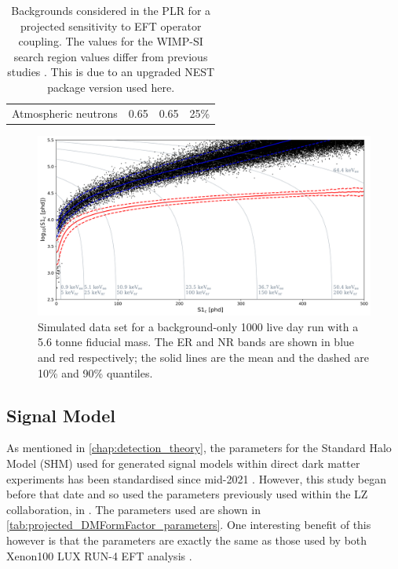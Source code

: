 \begin{table}[]
\begin{tabular}{c|c|c|c}
        Atmospheric neutrons                         & 0.65                   & 0.65                    & 25\% \cite{atmospheric_neutrinos_rate_ref}      
    \end{tabular}
    \caption{Backgrounds considered in the PLR for a projected sensitivity to EFT operator coupling. The values for the WIMP-SI search region values differ from previous studies \cite{LZ_projected_sensitivity_paper_ref,LZ_Ibles_LZStats_Thesis_ref}. This is due to an upgraded NEST package version used here.}
    \label{tab:projected_lz_backgrounds}
\end{table}



\begin{figure}
    \centering
    \includegraphics[width=15cm]{Figures/EFT/Projected_backgrounds/projected_backgrounds_s1_s2.png}
    \caption{Simulated data set for a background-only 1000 live day run with a 5.6 tonne fiducial mass. The ER and NR bands are shown in blue and red respectively; the solid lines are the mean and the dashed are 10\% and 90\% quantiles.}
    \label{fig:my_label}
\end{figure}



\subsection{Signal Model}
\par
As mentioned in \autoref{chap:detection_theory}, the parameters for the Standard Halo Model (SHM) used for generated signal models within direct dark matter experiments has been standardised since mid-2021 \cite{standard_halo_model_conventions_ref}.
However, this study began before that date and so used the parameters previously used within the LZ collaboration, in \cite{LZ_projected_sensitivity_paper_ref,LZ_TechnicalDesignReview_ref,LZ_Ibles_LZStats_Thesis_ref}.
The parameters used are shown in \autoref{tab:projected_DMFormFactor_parameters}.
One interesting benefit of this however is that the parameters are exactly the same as those used by both Xenon100 \cite{xenon100_eft_ref} LUX RUN-4 EFT analysis \cite{LUX_RUN4_EFT_2021}.

